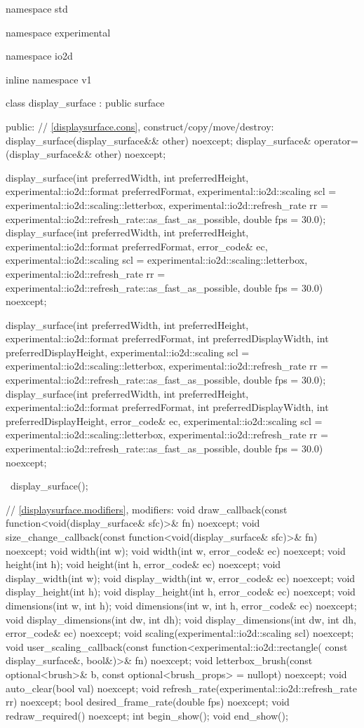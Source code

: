 \begin{codeblock}
namespace std { namespace experimental { namespace io2d { inline namespace v1 {
  class display_surface : public surface {
  public:
    // \ref{displaysurface.cons}, construct/copy/move/destroy:
    display_surface(display_surface&& other) noexcept;
    display_surface& operator=(display_surface&& other) noexcept;
    
    display_surface(int preferredWidth, int preferredHeight, 
      experimental::io2d::format preferredFormat,
      experimental::io2d::scaling scl = experimental::io2d::scaling::letterbox,
      experimental::io2d::refresh_rate rr =
      experimental::io2d::refresh_rate::as_fast_as_possible, double fps = 30.0);
    display_surface(int preferredWidth, int preferredHeight, 
      experimental::io2d::format preferredFormat, error_code& ec,
      experimental::io2d::scaling scl = experimental::io2d::scaling::letterbox,
      experimental::io2d::refresh_rate rr =
      experimental::io2d::refresh_rate::as_fast_as_possible, double fps = 30.0) 
      noexcept;
    
    display_surface(int preferredWidth, int preferredHeight, 
      experimental::io2d::format preferredFormat,
      int preferredDisplayWidth, int preferredDisplayHeight,
      experimental::io2d::scaling scl = experimental::io2d::scaling::letterbox,
      experimental::io2d::refresh_rate rr =
      experimental::io2d::refresh_rate::as_fast_as_possible, double fps = 30.0);
    display_surface(int preferredWidth, int preferredHeight, 
      experimental::io2d::format preferredFormat,
      int preferredDisplayWidth, int preferredDisplayHeight, error_code& ec,
      experimental::io2d::scaling scl = experimental::io2d::scaling::letterbox,
      experimental::io2d::refresh_rate rr =
      experimental::io2d::refresh_rate::as_fast_as_possible, double fps = 30.0) 
      noexcept;
    
    ~display_surface();
    
    // \ref{displaysurface.modifiers}, modifiers:
    void draw_callback(const function<void(display_surface& sfc)>& fn) noexcept;
    void size_change_callback(const function<void(display_surface& sfc)>& fn)
      noexcept;
    void width(int w);
    void width(int w, error_code& ec) noexcept;
    void height(int h);
    void height(int h, error_code& ec) noexcept;
    void display_width(int w);
    void display_width(int w, error_code& ec) noexcept;
    void display_height(int h);
    void display_height(int h, error_code& ec) noexcept;
    void dimensions(int w, int h);
    void dimensions(int w, int h, error_code& ec) noexcept;
    void display_dimensions(int dw, int dh);
    void display_dimensions(int dw, int dh, error_code& ec) noexcept;
    void scaling(experimental::io2d::scaling scl) noexcept;
    void user_scaling_callback(const function<experimental::io2d::rectangle(
      const display_surface&, bool&)>& fn) noexcept;
    void letterbox_brush(const optional<brush>& b,
      const optional<brush_props> = nullopt) noexcept;
    void auto_clear(bool val) noexcept;
    void refresh_rate(experimental::io2d::refresh_rate rr) noexcept;
    bool desired_frame_rate(double fps) noexcept;
    void redraw_required() noexcept;
    int begin_show();
    void end_show();
    
}}}}}
\end{codeblock}
